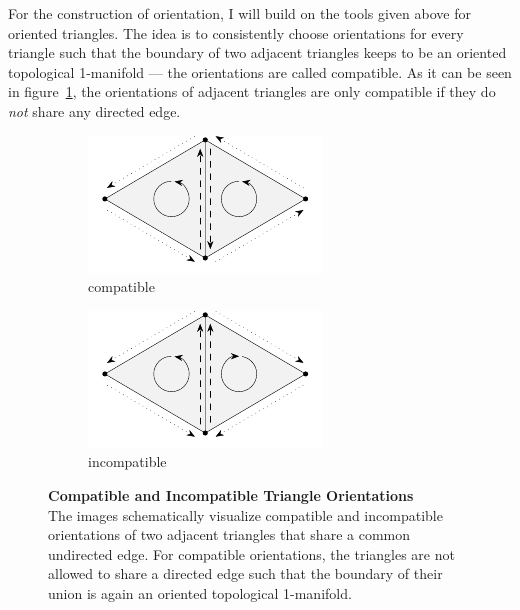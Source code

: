 \documentclass{stdlocal}
\begin{document}
  For the construction of orientation, I will build on the tools given above for oriented triangles.
  The idea is to consistently choose orientations for every triangle such that the boundary of two adjacent triangles keeps to be an oriented topological 1-manifold --- the orientations are called compatible.
  As it can be seen in figure~\ref{fig:compatible-triangle-orientations}, the orientations of adjacent triangles are only compatible if they do \textit{not} share any directed edge.

  \begin{figure}
    \centering
    \begin{subfigure}[b]{0.49\linewidth}
      \centering
      \includegraphics[width=0.8\linewidth]{figures/compatible-triangle-orientations.pdf}
      \caption{compatible}
    \end{subfigure}
    \hfill
    \begin{subfigure}[b]{0.49\linewidth}
      \centering
      \includegraphics[width=0.8\linewidth]{figures/incompatible-triangle-orientations.pdf}
      \caption{incompatible}
    \end{subfigure}
    \caption[Compatible and Incompatible Triangle Orientations]{%
      \textbf{Compatible and Incompatible Triangle Orientations}\\
      The images schematically visualize compatible and incompatible orientations of two adjacent triangles that share a common undirected edge.
      For compatible orientations, the triangles are not allowed to share a directed edge such that the boundary of their union is again an oriented topological 1-manifold.
    }
    \label{fig:compatible-triangle-orientations}
  \end{figure}
\end{document}
